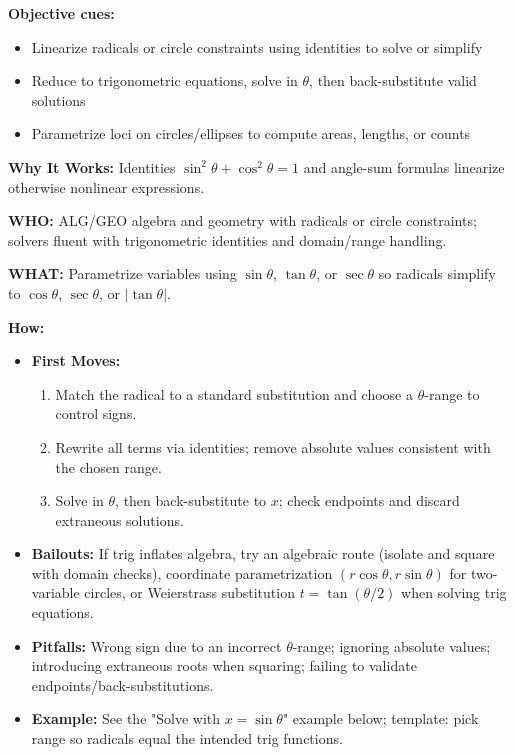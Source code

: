 \documentclass[12pt]{article}
\begin{document}
\textbf{Objective cues:}
\begin{itemize}
    \item Linearize radicals or circle constraints using identities to solve or simplify
    \item Reduce to trigonometric equations, solve in $\theta$, then back-substitute valid solutions
    \item Parametrize loci on circles/ellipses to compute areas, lengths, or counts
\end{itemize}

\textbf{Why It Works:} Identities $\sin^2\theta + \cos^2\theta = 1$ and angle-sum formulas linearize otherwise nonlinear expressions.

\textbf{WHO:} ALG/GEO algebra and geometry with radicals or circle constraints; solvers fluent with trigonometric identities and domain/range handling.

\textbf{WHAT:} Parametrize variables using $\sin\theta$, $\tan\theta$, or $\sec\theta$ so radicals simplify to $\cos\theta$, $\sec\theta$, or $|\tan\theta|$.


\textbf{How:}
\begin{itemize}
    \item \textbf{First Moves:}
    \begin{enumerate}[nosep]
        \item Match the radical to a standard substitution and choose a $\theta$-range to control signs.
        \item Rewrite all terms via identities; remove absolute values consistent with the chosen range.
        \item Solve in $\theta$, then back-substitute to $x$; check endpoints and discard extraneous solutions.
    \end{enumerate}
    \item \textbf{Bailouts:} If trig inflates algebra, try an algebraic route (isolate and square with domain checks), coordinate parametrization $(r\cos\theta, r\sin\theta)$ for two-variable circles, or Weierstrass substitution $t=\tan(\theta/2)$ when solving trig equations.
    \item \textbf{Pitfalls:} Wrong sign due to an incorrect $\theta$-range; ignoring absolute values; introducing extraneous roots when squaring; failing to validate endpoints/back-substitutions.
    \item \textbf{Example:} See the "Solve with $x=\sin\theta$" example below; template: pick range so radicals equal the intended trig functions.
\end{itemize}
\end{document}
